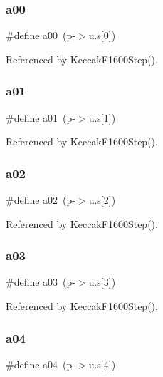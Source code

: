 \mbox{\label{shell_8c_abcdd64614c54a76885587778b89625af}} 
\subsubsection{a00}
{\footnotesize\ttfamily \#define a00~(p-\/$>$u.\+s[0])}



Referenced by Keccak\+F1600\+Step().

\mbox{\label{shell_8c_a87b3cac3f2a50e5f39bcf126e95d26e4}} 
\subsubsection{a01}
{\footnotesize\ttfamily \#define a01~(p-\/$>$u.\+s[1])}



Referenced by Keccak\+F1600\+Step().

\mbox{\label{shell_8c_a60a290e52fbcc01930022a5d4ee0b542}} 
\subsubsection{a02}
{\footnotesize\ttfamily \#define a02~(p-\/$>$u.\+s[2])}



Referenced by Keccak\+F1600\+Step().

\mbox{\label{shell_8c_abcea3235e61290c7c15d0f72d4ae128e}} 
\subsubsection{a03}
{\footnotesize\ttfamily \#define a03~(p-\/$>$u.\+s[3])}



Referenced by Keccak\+F1600\+Step().

\mbox{\label{shell_8c_a3eee2348f9320e8c457abcef14965308}} 
\subsubsection{a04}
{\footnotesize\ttfamily \#define a04~(p-\/$>$u.\+s[4])}



